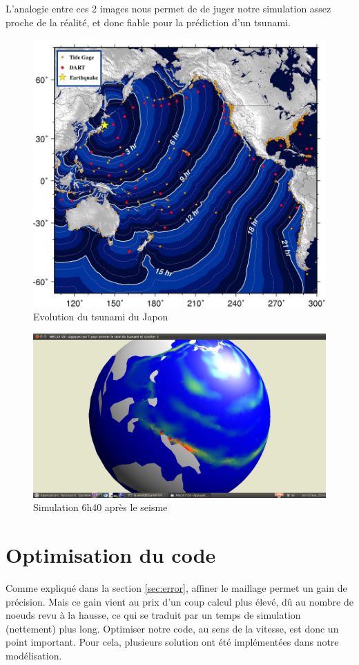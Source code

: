 \documentclass[a4paper,11pt]{article}
\begin{document}
L'analogie entre ces 2 images nous permet de de juger notre simulation assez proche de la réalité, et donc fiable pour la prédiction d'un tsunami.

\begin{figure}[H]
\centering
\includegraphics[width=0.7\linewidth]{NOAA.jpg}
\caption{Evolution du tsunami du Japon}
\label{fig:noaa}
\end{figure}

\begin{figure}[H]
\centering
\includegraphics[width=0.8\linewidth]{Cotes.png}
\caption{Simulation 6h40 après le seisme}
\label{fig:cote}
\end{figure}


\section{Optimisation du code}

Comme expliqué dans la section \ref{sec:error}, affiner le maillage permet un gain de précision. Mais ce gain vient au prix d'un coup calcul plus élevé, dû au nombre de noeuds revu à la hausse, ce qui se traduit par un temps de simulation (nettement) plus long. Optimiser notre code, au sens de la vitesse, est donc un point important. Pour cela, plusieurs solution ont été implémentées dans notre modélisation.\\
\end{document}
